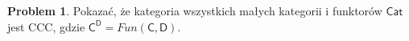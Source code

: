 \documentclass[10pt]{amsart}
\theoremstyle{plain}
\theoremstyle{definition}
\newtheorem{problem}{Problem}
\numberwithin{equation}{section}
\begin{document}
\begin{problem}
Pokazać, że kategoria wszystkich małych kategorii i funktorów $\mathsf{Cat}$ jest CCC, gdzie $\mathsf{C}^\mathsf{D} = Fun(\mathsf{C},\mathsf{D})$. 
\end{problem}
%
%
%
\end{document}
